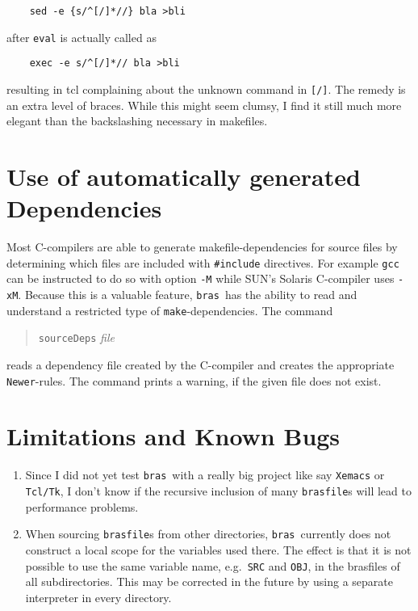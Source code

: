 \documentclass[12pt]{article}
\newcommand{\bras}{\texttt{bras}}
\newcommand{\make}{\texttt{make}}
\begin{document}
\begin{verbatim}
    sed -e {s/^[/]*//} bla >bli
\end{verbatim}

after \texttt{eval} is actually called as

\begin{verbatim}
    exec -e s/^[/]*// bla >bli
\end{verbatim}

resulting in tcl complaining about the unknown command in
\texttt{[/]}. The remedy is an extra level of braces. While this might
seem clumsy, I find it still much more elegant than the backslashing
necessary in makefiles.



\section{Use of automatically generated Dependencies}

Most C-compilers are able to generate makefile-dependencies for
source files by determining which files are included with
\texttt{\#include} directives. For example \texttt{gcc} can be
instructed to do so with option \texttt{-M} while SUN's Solaris
C-compiler uses \texttt{-xM}. Because this is a valuable feature,
\bras\ has the ability to read and understand a restricted type of
\make-dependencies. The command
\begin{quote}
  \texttt{sourceDeps} \textit{file}
\end{quote}
reads a dependency file created by the C-compiler and creates the
appropriate \texttt{Newer}-rules. The command prints a warning, if
the given file does not exist.
   
\section{Limitations and Known Bugs}


\begin{enumerate}
\item
Since I did not yet test \bras\ with a really big project like say
\texttt{Xemacs} or \texttt{Tcl/Tk}, I don't know if the recursive
inclusion of many \texttt{brasfile}s will lead to performance
problems.

\item
When sourcing \texttt{brasfile}s from other directories, \bras\
currently does not construct a local scope for the variables used
there. The effect is that it is not possible to use the same variable
name, e.g.\ \texttt{SRC} and \texttt{OBJ}, in the brasfiles
of all subdirectories. This may be corrected in the future by using a
separate interpreter in every directory.

\end{enumerate}
\end{document}
